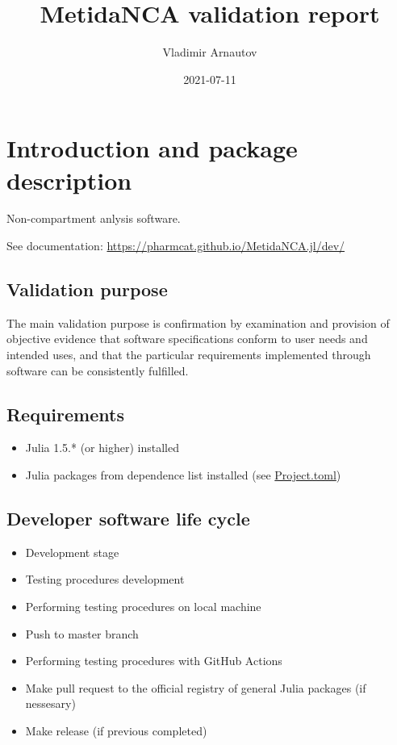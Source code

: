 \documentclass[12pt,a4paper]{article}
\title{ MetidaNCA validation report }
\author{ Vladimir Arnautov }
\date{ 2021-07-11 }
\begin{document}
\maketitle


\section{Introduction and package description}
Non-compartment anlysis software.

See documentation: \href{https://pharmcat.github.io/MetidaNCA.jl/dev/}{https://pharmcat.github.io/MetidaNCA.jl/dev/}

\subsection{Validation purpose}
The main validation purpose is confirmation by examination and provision of objective evidence that software specifications conform to user needs and intended uses, and that the particular requirements implemented through software can be consistently fulfilled.

\subsection{Requirements}
\begin{itemize}
\item Julia 1.5.* (or higher) installed


\item Julia packages from dependence list installed (see \href{https://github.com/PharmCat/MetidaNCA.jl/blob/main/Project.toml}{Project.toml})

\end{itemize}
\subsection{Developer software life cycle}
\begin{itemize}
\item Development stage


\item Testing procedures development


\item Performing testing procedures on local machine


\item Push to master branch


\item Performing testing procedures with GitHub Actions


\item Make pull request to the official registry of general Julia packages (if nessesary)


\item Make release (if previous completed)

\end{itemize}
\end{document}
